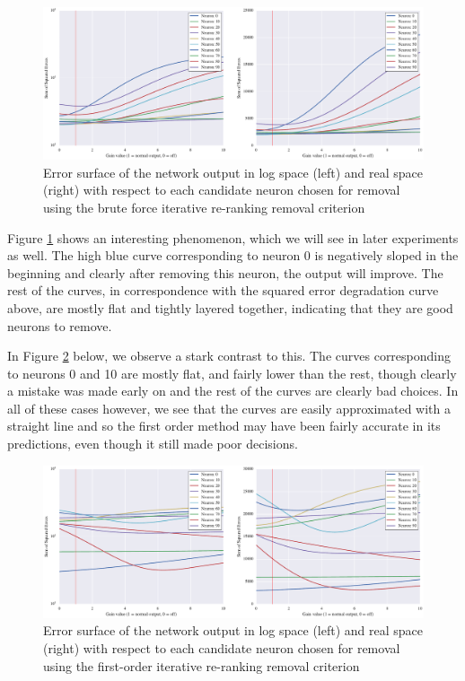 \begin{figure}[!ht]
\centering
\includegraphics[width=\linewidth]{png/mnist-test-single-digit-0-gt.pdf}
\caption{Error surface of the network output in log space (left) and real space (right) with respect to each candidate neuron chosen for removal using the brute force iterative re-ranking removal criterion}
\label{fig:mnist-test-single-digit-0-gt}
\end{figure}

Figure \ref{fig:mnist-test-single-digit-0-gt} shows an interesting phenomenon, which we will see in later experiments as well. The high blue curve corresponding to neuron 0 is negatively sloped in the beginning and clearly after removing this neuron, the output will improve. The rest of the curves, in correspondence with the squared error degradation curve above, are mostly flat and tightly layered together, indicating that they are good neurons to remove. 

In Figure \ref{fig:mnist-test-single-digit-0-g1} below, we observe a stark contrast to this. The curves corresponding to neurons 0 and 10 are mostly flat, and fairly lower than the rest, though clearly a mistake was made early on and the rest of the curves are clearly bad choices. In all of these cases however, we see that the curves are easily approximated with a straight line and so the first order method may have been fairly accurate in its predictions, even though it still made poor decisions. 

\begin{figure}[!ht]
\centering
\includegraphics[width=\linewidth]{png/mnist-test-single-digit-0-g1.pdf}
\caption{Error surface of the network output in log space (left) and real space (right) with respect to each candidate neuron chosen for removal using the first-order iterative re-ranking removal criterion}
\label{fig:mnist-test-single-digit-0-g1}
\end{figure}

